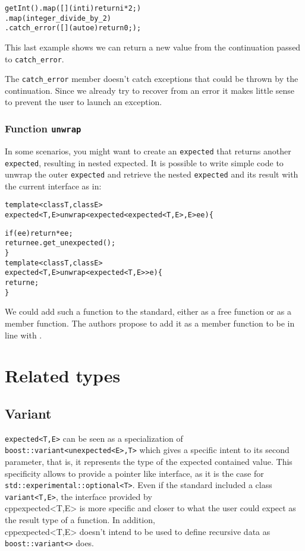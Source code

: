 \documentclass[a4paper,10pt]{article}
\newcommand{\cpp}[1]{\lstinline{#1}}
\begin{document}
\begin{alltt}
getInt().map([](int i){return i * 2;})
        .map(integer_divide_by_2)
        .catch_error([](auto e) { return 0; });
\end{alltt}
\noindent
This last example shows we can return a new value from the continuation passed to \cpp{catch_error}.
\newline

The \cpp{catch_error} member doesn't catch exceptions that could be thrown by the continuation. Since we already try to recover from an error it makes little sense to prevent the user to launch an exception.

\subsubsection{Function \cpp{unwrap}}

In some scenarios, you might want to create an \cpp{expected} that returns another \cpp{expected}, resulting in nested expected. It is possible to write simple code to unwrap the outer \cpp{expected} and retrieve the nested \cpp{expected} and its result with the current interface as in:

\begin{alltt}
template <class T, class E>
expected<T,E> unwrap<expected<expected<T,E>,E> ee) \{

  if (ee) return *ee;
  return ee.get_unexpected();
\}
template <class T, class E>
expected<T,E> unwrap<expected<T,E>> e) \{ 
  return e;
\}
\end{alltt}

We could add such a function to the standard, either as a free function or as a member function. The authors propose to add it as a member function to be in line with \cite{ImprovementsAsync}.

\section{Related types}

\subsection{Variant}

\cpp{expected<T,E>} can be seen as a specialization of  \cpp{boost::variant<unexpected<E>,T>} which gives a specific intent to its second parameter, that is, it represents the type of the expected contained value. This specificity allows to provide a pointer like interface, as it is the case for \cpp{std::experimental::optional<T>}. Even if the standard included a class  \cpp{variant<T,E>}, the interface provided by \\cpp{expected<T,E>} is more specific and closer to what the user could expect as the result type of a function. In addition, \\cpp{expected<T,E>} doesn't intend to be used to define recursive data as \cpp{boost::variant<>} does.
\end{document}
